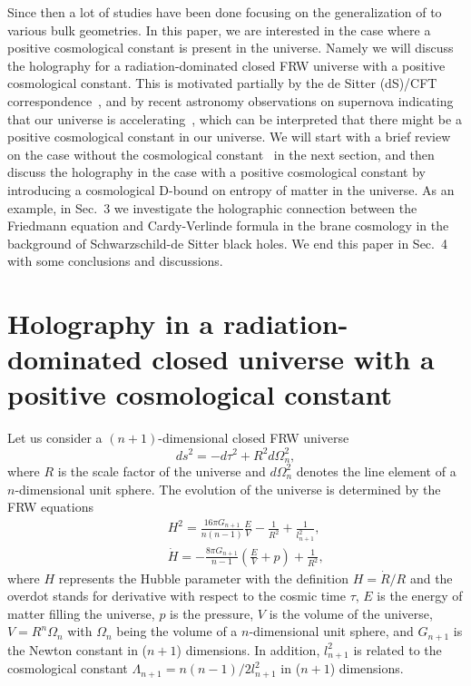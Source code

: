 \documentclass[a4paper,12pt]{article}
\begin{document}
Since then a lot of studies have been done focusing on the
generalization of \cite{Verl,SV} to various bulk geometries. In
this paper, we are interested in the case where a positive cosmological
constant is present in the universe. Namely we will discuss the holography 
for a radiation-dominated closed FRW universe with a positive
cosmological constant. This is motivated partially by the de 
Sitter (dS)/CFT correspondence~\cite{Strom}, and by recent astronomy 
observations on supernova indicating that our universe is accelerating~\cite{Super}, 
which can be 
interpreted that there might be a positive cosmological constant in our 
universe. We will start with a brief review on the case 
without the cosmological constant~\cite{Verl} in the next section, and then
discuss the holography in the case with a positive cosmological constant 
by introducing a cosmological D-bound on entropy of matter in the universe. 
As an example, in Sec.~3 we investigate the holographic connection between the 
Friedmann equation and Cardy-Verlinde formula in the brane cosmology in the
background of Schwarzschild-de Sitter black holes. We end this paper in 
Sec.~4 with some conclusions and discussions.  



\section{Holography in a radiation-dominated closed universe
with a positive cosmological constant}

Let us consider a $(n+1)$-dimensional closed FRW universe
\begin{equation}
\label{2eq1} ds^2 =-d\tau^2 +R^2 d\Omega^2_n,
\end{equation}
where $R$ is the  scale factor of the universe and $d\Omega^2_n$
denotes the line element of a $n$-dimensional unit sphere.
The evolution of the universe is determined by the FRW equations
\begin{eqnarray}
\label{2eq2}
 && H^2 =\frac{16\pi G_{n+1}}{n(n-1)}\frac{E}{V}
-\frac{1}{R^2}
     +\frac{1}{l^2_{n+1}}, \nonumber \\
&& \dot H =-\frac{8\pi G_{n+1}}{n-1}\left (\frac{E}{V} +p\right)
    +\frac{1}{R^2},
\end{eqnarray}
where $H$ represents the Hubble parameter with the definition
$H=\dot R/R$ and the overdot stands for  derivative with
respect to the cosmic time $\tau$,  $E$ is the energy of matter
filling the universe, $p$ is the pressure, $V$ is the
volume of the universe, $V=R^n \Omega_n$ with $\Omega_n$ being the
volume of a $n$-dimensional unit sphere, and $G_{n+1}$ is the
Newton constant in ($n+1$) dimensions. In addition,
$l^2_{n+1}$ is related to the cosmological constant
$\Lambda_{n+1}= n(n-1)/2l^2_{n+1}$ in ($n+1$) dimensions.
\end{document}
